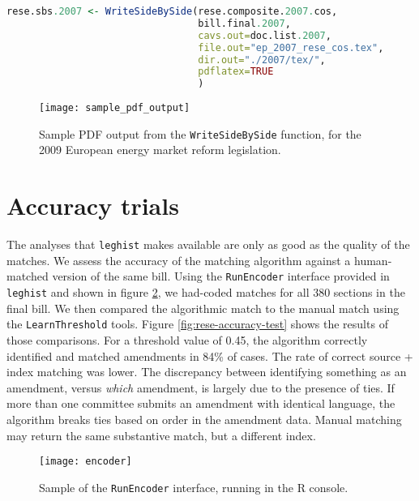 \documentclass[11pt]{article}
\begin{document}
\begin{lstlisting}[language=R]
rese.sbs.2007 <- WriteSideBySide(rese.composite.2007.cos,
                                 bill.final.2007,
                                 cavs.out=doc.list.2007,
                                 file.out="ep_2007_rese_cos.tex",
                                 dir.out="./2007/tex/",
                                 pdflatex=TRUE
                                 )
\end{lstlisting}

\begin{figure}[ht]
  \centering
  \texttt{[image: sample\_pdf\_output]}
  \label{fig:pdf-output}
  \caption{Sample PDF output from the \texttt{WriteSideBySide} function, for the 2009 European energy market reform legislation.}
\end{figure}

 


\section{Accuracy trials}
\label{sec:accuracy-trials}

The analyses that \texttt{leghist} makes available are only as good as the
quality of the matches. We assess the accuracy of the matching
algorithm against a human-matched version of the same bill. Using the 
\texttt{RunEncoder} interface provided in \texttt{leghist} and shown
in figure \ref{fig:encoder-interface}, we had-coded matches for all
380 sections in the final bill. We then compared the algorithmic match
to the manual match using the \texttt{LearnThreshold}
tools. Figure \ref{fig:rese-accuracy-test} shows the results of those
comparisons. For a threshold value of 0.45, the algorithm correctly
identified and matched amendments in 84\% of cases. The rate of
correct source + index matching was lower. The discrepancy between
identifying something as an amendment, versus \textit{which}
amendment, is largely due to the presence of ties. If
more than one committee submits an amendment with identical language,
the algorithm breaks ties based on order in the amendment data. Manual
matching may return the same substantive match, but a different
index.


\begin{figure}[ht]
  \centering
  \texttt{[image: encoder]}
  \caption{Sample of the \texttt{RunEncoder} interface, running in the R console. }
  \label{fig:encoder-interface}
\end{figure}
\end{document}
